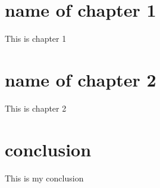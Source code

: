 
\chapter{name of chapter 1}
\label{sec:orge980302}
This is chapter 1
\chapter{name of chapter 2}
\label{sec:org87d02cb}
This is chapter 2
\chapter{conclusion}
\label{sec:org386299a}
This is my conclusion
